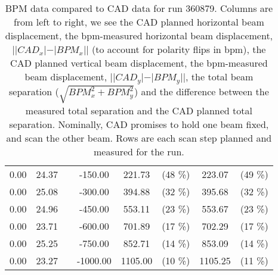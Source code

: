 \begin{table}
\begin{tabular}{c c c c c c c c}
0.00 & 24.37 &  & -150.00 & 221.73 &  (48 \%) & 223.07 &  (49 \%)\\
0.00 & 25.08 &  & -300.00 & 394.88 &  (32 \%) & 395.68 &  (32 \%)\\
0.00 & 24.96 &  & -450.00 & 553.11 &  (23 \%) & 553.67 &  (23 \%)\\
0.00 & 23.71 &  & -600.00 & 701.89 &  (17 \%) & 702.29 &  (17 \%)\\
0.00 & 25.25 &  & -750.00 & 852.71 &  (14 \%) & 853.09 &  (14 \%)\\
0.00 & 23.27 &  & -1000.00 & 1105.00 &  (10 \%) & 1105.25 &  (11 \%)\\
\bottomrule
\end{tabular}
\caption{ BPM data compared to CAD data for run 360879. Columns are from left to right, we see the CAD planned horizontal beam displacement, the bpm-measured horizontal beam displacement, $||CAD_{x}| - |BPM_{x}||$ (to account for polarity flips in bpm), the CAD planned vertical beam displacement, the bpm-measured beam displacement, $||CAD_{y}| - |BPM_{y}||$, the total beam separation ($\sqrt{BPM_{x}^2+BPM_{y}^2}$) and the difference between the measured total separation and the CAD planned total separation. Nominally, CAD promises to hold one beam fixed, and scan the other beam. Rows are each scan step planned and measured for the run. }
\label{0xffb3a73c}
\end{table}
